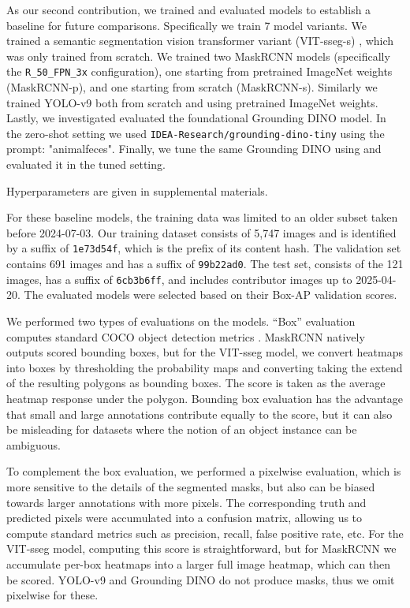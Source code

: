 \documentclass{article}
\begin{document}
As our second contribution, we trained and evaluated models to establish a baseline for future comparisons.
Specifically we train 7 model variants.
We trained a semantic segmentation vision transformer variant (VIT-sseg-s)
  \cite{Greenwell_2024_WACV,crall_geowatch_2024}, which was only trained from scratch.
We trained two MaskRCNN \cite{he2017mask} models (specifically the \texttt{R\_50\_FPN\_3x} configuration),
  one starting from pretrained ImageNet weights (MaskRCNN-p), and one starting from scratch
  (MaskRCNN-s).
Similarly we trained YOLO-v9 \cite{wang2024yolov9} both from scratch and using pretrained ImageNet weights.
Lastly, we investigated evaluated the foundational Grounding DINO \cite{liu_grounding_2024} model. 
In the zero-shot setting we used \texttt{IDEA-Research/grounding-dino-tiny} using the prompt: "animalfeces".
Finally, we tune the same Grounding DINO using \cite{OpenGroundingDino} and evaluated it in the tuned setting.


Hyperparameters are given in supplemental materials.


For these baseline models, the training data was limited to an older subset taken before 2024-07-03.
Our training dataset consists of 5,747 images and is identified by a suffix of {\tt 1e73d54f}, which is the
  prefix of its content hash.
The validation set contains 691 images and has a suffix of {\tt 99b22ad0}.
The test set, consists of the 121 images, has a suffix of {\tt 6cb3b6ff}, and includes contributor images
  up to 2025-04-20.
The evaluated models were selected based on their Box-AP validation scores.

We performed two types of evaluations on the models.
``Box'' evaluation computes standard COCO object detection metrics \cite{lin_microsoft_2014}.
MaskRCNN natively outputs scored bounding boxes, but for the VIT-sseg model, we convert heatmaps into boxes
  by thresholding the probability maps and converting taking the extend of the resulting polygons as bounding
  boxes.
The score is taken as the average heatmap response under the polygon.
Bounding box evaluation has the advantage that small and large annotations contribute equally to the score,
  but it can also be misleading for datasets where the notion of an object instance can be ambiguous.

To complement the box evaluation, we performed a pixelwise evaluation, which is more sensitive to the
  details of the segmented masks, but also can be biased towards larger annotations with more pixels.
The corresponding truth and predicted pixels were accumulated into a confusion matrix, allowing us to
  compute standard metrics \cite{powers_evaluation_2011} such as precision, recall, false positive rate, etc.
For the VIT-sseg model, computing this score is straightforward, but for MaskRCNN we accumulate per-box
  heatmaps into a larger full image heatmap, which can then be scored.
YOLO-v9 and Grounding DINO do not produce masks, thus we omit pixelwise for these.
\end{document}
